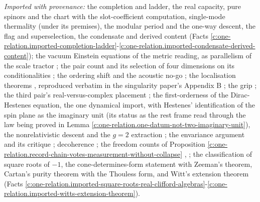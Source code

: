 \documentclass[11pt]{article}
\theoremstyle{definition}
\theoremstyle{plain}
\begin{document}
\emph{Imported with provenance:} the completion and ladder, the real capacity, pure spinors and the chart with the slot-coefficient computation, single-mode thermality (under its premises), the modular period and the one-way descent, the flag and superselection, the condensate and derived content (Facts \ref{c:one-relation.imported-completion-ladder}-\ref{c:one-relation.imported-condensate-derived-content}); the vacuum Einstein equations of the metric reading, as parallelism of the scale tractor \cite[Thm.~4.5]{ButlerT6}; the pair count and its selection of four dimensions on its conditionalities \cite[Lem.~2.12, Prop.~4.3]{ButlerT12}; the ordering shift \cite[Prop.~5.6]{ButlerT9} and the acoustic no-go \cite[Prop.~5.2]{ButlerT10}; the localisation theorems \cite[Thm.~4.4, Cor.~4.5, Thm.~8.12]{ButlerT4}, reproduced verbatim in the singularity paper's Appendix B \cite{ButlerT5}; the grip \cite[Def.~5.4, Thm.~5.6]{ButlerT11}; the third pair's real-versus-complex placement \cite[Fact~2.9]{ButlerT14}; the first-orderness of the Dirac-Hestenes equation, the one dynamical import, with Hestenes' identification of the spin plane as the imaginary unit (its status as the rest frame read through the law being proved in Lemma \ref{c:one-relation.one-datum-not-two-imaginary-unit}), the nonrelativistic descent and the $g = 2$ extraction \cite{Hestenes1967, Hestenes1975}; the envariance argument and its critique \cite{Zurek2005}; decoherence \cite{Zeh1970, JoosZeh1985}; the freedom counts of Proposition \ref{c:one-relation.record-chain-votes-measurement-without-collapse} \cite[Prop.~7.6]{ButlerT12}, \cite[Prop.~5.1, Prop.~5.2]{ButlerT14}; the classification of square roots of $-1$, the cone-determines-form statement with Zeeman's theorem, Cartan's purity theorem with the Thouless form, and Witt's extension theorem (Facts \ref{c:one-relation.imported-square-roots-real-clifford-algebras}-\ref{c:one-relation.imported-witts-extension-theorem}).
\end{document}
